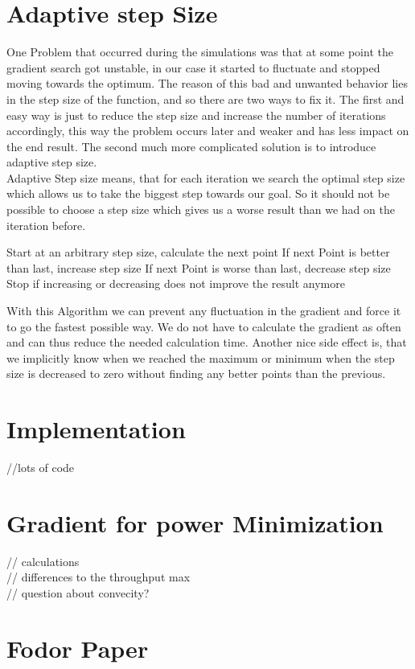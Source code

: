 \section{Adaptive step Size}
One Problem that occurred during the simulations was that at some point the gradient search got unstable, in our case it started to fluctuate and stopped moving towards the optimum. The reason of this bad and unwanted behavior lies in the step size of the function, and so there are two ways to fix it. The first and easy way is just to reduce the step size and increase the number of iterations accordingly, this way the problem occurs later and weaker and has less impact on the end result. The second much more complicated solution is to introduce adaptive step size.\\
Adaptive Step size means, that for each iteration we search the optimal step size which allows us to take the biggest step towards our goal. So it should not be possible to choose a step size which gives us a worse result than we had on the iteration before.
\begin{algorithm}
	Start at an arbitrary step size, calculate the next point
	If next Point is better than last, increase step size
	If next Point is worse than last, decrease step size
	Stop if increasing or decreasing does not improve the result anymore
\end{algorithm}
With this Algorithm we can prevent any fluctuation in the gradient and force it to go the fastest possible way. We do not have to calculate the gradient as often and can thus reduce the needed calculation time. Another nice side effect is, that we implicitly know when we reached the maximum or minimum when the step size is decreased to zero without finding any better points than the previous.

\section{Implementation}
//lots of code\\

\section{Gradient for power Minimization}
// calculations\\
// differences to the throughput max\\
// question about convecity?\\

\section{Fodor Paper}

